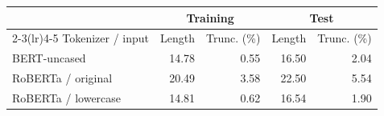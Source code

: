 \begin{tabular}{lrrrr}
\toprule
 & \multicolumn{2}{c}{Training} & \multicolumn{2}{c}{Test} \\
\cmidrule(lr){2-3}\cmidrule(lr){4-5}
Tokenizer / input & Length & Trunc. (\%) & Length & Trunc. (\%) \\
\midrule
BERT-uncased & 14.78 & 0.55 & 16.50 & 2.04 \\
RoBERTa / original & 20.49 & 3.58 & 22.50 & 5.54 \\
RoBERTa / lowercase & 14.81 & 0.62 & 16.54 & 1.90 \\
\bottomrule
\end{tabular}
